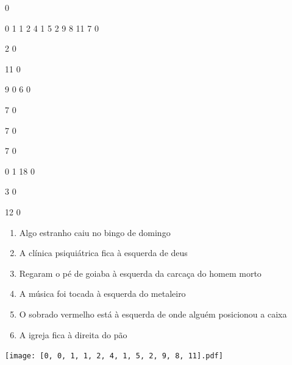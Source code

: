 \documentclass[12pt]{article}
\begin{document}
		\vfill  
		  
{
	0	%

	0	%
	1	%
	1	%
	2	%
	4	%
	1	%
	5	%
	2	%
	9	%
	8	%
	11	%
	7	%
	0	%

	2	%
	0	%

	11	%
	0	%

	9	%
	0	%
	6	%
	0	%

	7	%
	0	%

	7	%
	0	%

	7	%
	0	%

	0	%
	1	%
	18	%
	0	%

	3	%
	0	%

	12	%
	0	%

}	  
		    	

		 

\pagebreak


	\begin{enumerate}
		  \sffamily %
		  \large %


\vfill \item
Algo estranho caiu	%
no bingo de domingo	%

\vfill \item
A clínica psiquiátrica fica	%
à esquerda
de deus	%

\vfill \item
Regaram o pé de goiaba	%
à esquerda
da carcaça do homem morto	%

\vfill \item
A música foi tocada	%
à esquerda
do metaleiro	%

\vfill \item
O sobrado vermelho está	%
à esquerda
de onde alguém posicionou a caixa	%

\vfill \item
A igreja fica	%
à direita
do pão	%
	\end{enumerate}
		  
		  \hfill

		  \vfill

\texttt{[image: [0, 0, 1, 1, 2, 4, 1, 5, 2, 9, 8, 11].pdf]}


	\hfill	  	  
\end{document}
